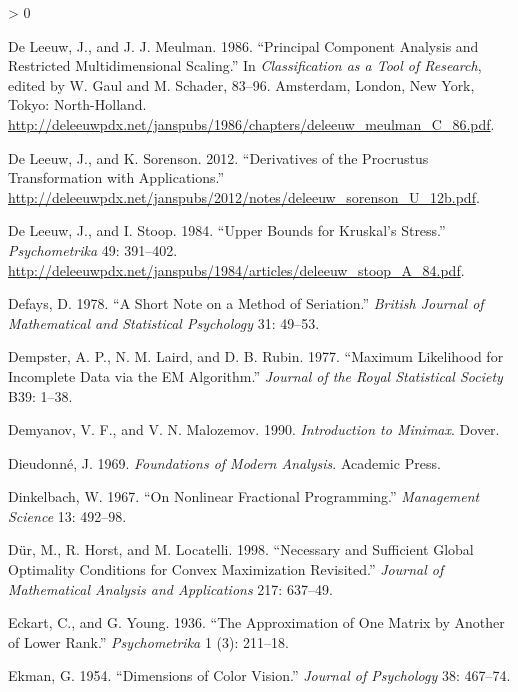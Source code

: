 \documentclass[
  12pt,
]{book}
\newlength{\cslhangindent}
\newenvironment{CSLReferences}[2] %
 {%
  \setlength{\parindent}{0pt}
  \ifodd #1 \everypar{\setlength{\hangindent}{\cslhangindent}}\ignorespaces\fi
  \ifnum #2 > 0
  \setlength{\parskip}{#2\baselineskip}
  \fi
 }%
 {}
\theoremstyle{definition}
\theoremstyle{definition}
\theoremstyle{definition}
\theoremstyle{definition}
\theoremstyle{remark}
\begin{document}
\begin{CSLReferences}{1}{0}
\leavevmode\hypertarget{ref-deleeuw_meulman_C_86}{}%
De Leeuw, J., and J. J. Meulman. 1986. {``Principal Component Analysis and Restricted Multidimensional Scaling.''} In \emph{Classification as a Tool of Research}, edited by W. Gaul and M. Schader, 83--96. Amsterdam, London, New York, Tokyo: North-Holland. \url{http://deleeuwpdx.net/janspubs/1986/chapters/deleeuw_meulman_C_86.pdf}.

\leavevmode\hypertarget{ref-deleeuw_sorenson_U_12b}{}%
De Leeuw, J., and K. Sorenson. 2012. {``{Derivatives of the Procrustus Transformation with Applications}.''} \url{http://deleeuwpdx.net/janspubs/2012/notes/deleeuw_sorenson_U_12b.pdf}.

\leavevmode\hypertarget{ref-deleeuw_stoop_A_84}{}%
De Leeuw, J., and I. Stoop. 1984. {``Upper Bounds for Kruskal's Stress.''} \emph{Psychometrika} 49: 391--402. \url{http://deleeuwpdx.net/janspubs/1984/articles/deleeuw_stoop_A_84.pdf}.

\leavevmode\hypertarget{ref-defays_78}{}%
Defays, D. 1978. {``{A Short Note on a Method of Seriation}.''} \emph{British Journal of Mathematical and Statistical Psychology} 31: 49--53.

\leavevmode\hypertarget{ref-dempster_laird_rubin_77}{}%
Dempster, A. P., N. M. Laird, and D. B. Rubin. 1977. {``{Maximum Likelihood for Incomplete Data via the EM Algorithm}.''} \emph{Journal of the Royal Statistical Society} B39: 1--38.

\leavevmode\hypertarget{ref-demyanov_malozemov_90}{}%
Demyanov, V. F., and V. N. Malozemov. 1990. \emph{Introduction to Minimax}. Dover.

\leavevmode\hypertarget{ref-dieudonne_69}{}%
Dieudonné, J. 1969. \emph{Foundations of Modern Analysis}. Academic Press.

\leavevmode\hypertarget{ref-dinkelbach_67}{}%
Dinkelbach, W. 1967. {``{On Nonlinear Fractional Programming}.''} \emph{Management Science} 13: 492--98.

\leavevmode\hypertarget{ref-dur_horst_locatelli_98}{}%
Dür, M., R. Horst, and M. Locatelli. 1998. {``{Necessary and Sufficient Global Optimality Conditions for Convex Maximization Revisited}.''} \emph{Journal of Mathematical Analysis and Applications} 217: 637--49.

\leavevmode\hypertarget{ref-eckart_young_36}{}%
Eckart, C., and G. Young. 1936. {``{The Approximation of One Matrix by Another of Lower Rank}.''} \emph{Psychometrika} 1 (3): 211--18.

\leavevmode\hypertarget{ref-ekman_54}{}%
Ekman, G. 1954. {``{Dimensions of Color Vision}.''} \emph{Journal of Psychology} 38: 467--74.


\end{CSLReferences}
\end{document}
